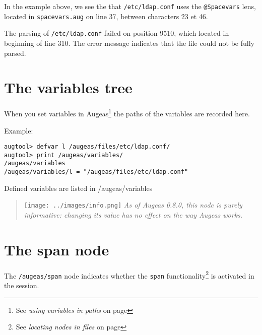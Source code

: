 In the example above, we see the that \verb!/etc/ldap.conf! uses the \verb!@Spacevars! lens, located in \verb!spacevars.aug! on line 37, between characters 23 et 46.

The parsing of \verb!/etc/ldap.conf! failed on position 9510, which located in beginning of line 310. The error message indicates that the file could not be fully parsed.


\section{The variables tree}

 

When you set variables in Augeas\footnote{See \emph{using variables in paths} on page \pageref{sec:variables}} the paths of the variables are recorded here.

 

Example:

\begin{listing}
  \begin{verbatim}
augtool> defvar l /augeas/files/etc/ldap.conf/
augtool> print /augeas/variables/
/augeas/variables
/augeas/variables/l = "/augeas/files/etc/ldap.conf"
  \end{verbatim}
  \caption{Defined variables are listed in /augeas/variables}
  \label{lst:metadata_defvar}
\end{listing}

\begin{quote}
\texttt{[image: ../images/info.png]} \emph{As of Augeas 0.8.0, this node is purely informative: changing its value has no effect on the way Augeas works.}

\end{quote}
\section{The span node}

\label{sec:span_node}   

The \verb!/augeas/span! node indicates whether the \verb!span! functionality\footnote{See \emph{locating nodes in files} on page \pageref{sec:locating_nodes}} is activated in the session.

